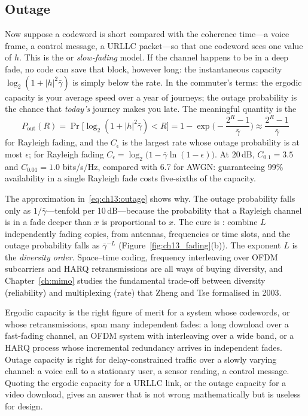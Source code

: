 \subsection{Outage}

Now suppose a codeword is short compared with the coherence time---a voice frame, a control
message, a URLLC packet---so that one codeword sees one value of $h$. This is the
 or \emph{slow-fading} model. If the channel happens to be in a deep fade, no
code can save that block, however long: the instantaneous capacity $\log_2(1+|h|^2\bar\gamma)$ is
simply below the rate. In the commuter's terms: the ergodic capacity is your average speed over a
year of journeys; the outage probability is the chance that \emph{today's} journey makes you late.
The meaningful quantity is the 
\begin{equation}
P_{\text{out}}(R)=\Pr\!\big[\log_2(1+|h|^2\bar\gamma)<R\big]
=1-\exp\!\Big(-\frac{2^R-1}{\bar\gamma}\Big)\approx\frac{2^R-1}{\bar\gamma}
\label{eq:ch13:outage}
\end{equation}
for Rayleigh fading, and the  $C_\epsilon$ is the largest rate whose
outage probability is at most $\epsilon$; for Rayleigh fading
$C_\epsilon=\log_2\big(1-\bar\gamma\ln(1-\epsilon)\big)$. At 20\,dB, $C_{0.1}=3.5$ and $C_{0.01}=1.0$
bits/s/Hz, compared with 6.7 for AWGN: guaranteeing 99\% availability in a single Rayleigh fade costs
five-sixths of the capacity.

The approximation in~\eqref{eq:ch13:outage} shows why. The outage probability falls only as
$1/\bar\gamma$---tenfold per 10\,dB---because the probability that a Rayleigh channel is in a fade
deeper than $x$ is proportional to $x$. The cure is : combine $L$ independently
fading copies, from antennas, frequencies or time slots, and the outage probability falls as
$\bar\gamma^{-L}$ (Figure~\ref{fig:ch13_fading}(b)). The exponent $L$ is the \emph{diversity order}.
Space--time coding, frequency interleaving over OFDM subcarriers and HARQ retransmissions are all
ways of buying diversity, and Chapter~\ref{ch:mimo} studies the fundamental trade-off between
diversity (reliability) and multiplexing (rate) that Zheng and Tse formalised in 2003.

\begin{pitfall}
Ergodic capacity is the right figure of merit for a system whose codewords, or whose
retransmissions, span many independent fades: a long download over a fast-fading channel, an OFDM
system with interleaving over a wide band, or a HARQ process whose incremental redundancy arrives in
independent fades. Outage capacity is right for delay-constrained traffic over a slowly varying
channel: a voice call to a stationary user, a sensor reading, a control message. Quoting the ergodic
capacity for a URLLC link, or the outage capacity for a video download, gives an answer that is not
wrong mathematically but is useless for design.
\end{pitfall}

